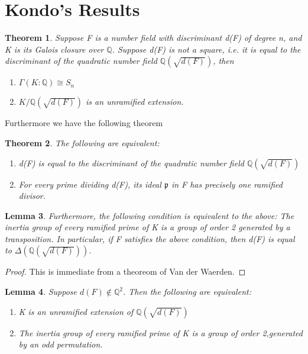 \documentclass[preprint,12pt,reqno]{elsarticle}
\newtheorem{theorem}{Theorem}
\newtheorem{lemma}[theorem]{Lemma}
\begin{document}
\section{Kondo's Results}
\begin{theorem}
    Suppose F is a number field with discriminant d(F) of degree n, and K is its Galois closure over $\mathbb{Q}$. Suppose d(F) is not a square, i.e. it is equal to the discriminant of the quadratic number field $\mathbb{Q}(\sqrt{d(F)})$, then \begin{enumerate}
        \item $\Gamma(K:\mathbb{Q})\cong S_n$
        \item $K/\mathbb{Q}(\sqrt{d(F)})$ is an unramified extension.
    \end{enumerate}
\end{theorem}
Furthermore we have the following theorem \begin{theorem}
    The following are equivalent: \begin{enumerate}
        \item d(F) is equal to the discriminant of the quadratic number field $\mathbb{Q}(\sqrt{d(F)})$
        \item For every prime dividing d(F), its ideal $\mathfrak{p}$ in F has precisely one ramified divisor.
    \end{enumerate}
\end{theorem}
\begin{lemma}
Furthermore, the following condition is equivalent to the above:
\newline
    The inertia group of every ramified prime of K is a group of order 2 generated by a transposition.\newline
In particular, if F satisfies the above condition, then d(F) is equal to $\Delta(\mathbb{Q}(\sqrt{d(F)}))$.
\end{lemma}
\begin{proof}
This is immediate from a theoreom of Van der Waerden. 
\end{proof}
\begin{lemma}
Suppose $d(F)\notin \mathbb{Q}^2$. Then the following are equivalent:\begin{enumerate}
    \item K is an unramified extension of $\mathbb{Q}(\sqrt{d(F)})$
    \item The inertia group of every ramified prime of K is a group of order 2,generated by an odd permutation. 
\end{enumerate}
\end{lemma} 
\end{document}
